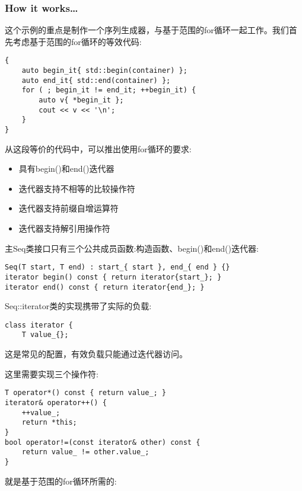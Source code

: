 \subsubsection{How it works…}

这个示例的重点是制作一个序列生成器，与基于范围的for循环一起工作。我们首先考虑基于范围的for循环的等效代码:

\begin{lstlisting}[style=styleCXX]
{
	auto begin_it{ std::begin(container) };
	auto end_it{ std::end(container) };
	for ( ; begin_it != end_it; ++begin_it) {
		auto v{ *begin_it };
		cout << v << '\n';
	}
}
\end{lstlisting}

从这段等价的代码中，可以推出使用for循环的要求:

\begin{itemize}
\item 
具有begin()和end()迭代器

\item 
迭代器支持不相等的比较操作符

\item 
迭代器支持前缀自增运算符

\item 
迭代器支持解引用操作符
\end{itemize}

主Seq类接口只有三个公共成员函数:构造函数、begin()和end()迭代器:

\begin{lstlisting}[style=styleCXX]
Seq(T start, T end) : start_{ start }, end_{ end } {}
iterator begin() const { return iterator{start_}; }
iterator end() const { return iterator{end_}; }
\end{lstlisting}

Seq::iterator类的实现携带了实际的负载:

\begin{lstlisting}[style=styleCXX]
class iterator {
	T value_{};
\end{lstlisting}

这是常见的配置，有效负载只能通过迭代器访问。

这里需要实现三个操作符:

\begin{lstlisting}[style=styleCXX]
T operator*() const { return value_; }
iterator& operator++() {
	++value_;
	return *this;
}
bool operator!=(const iterator& other) const {
	return value_ != other.value_;
}
\end{lstlisting}

就是基于范围的for循环所需的:

